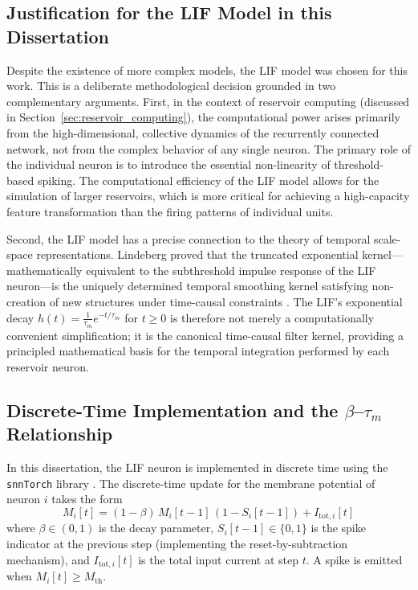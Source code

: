 \subsection{Justification for the LIF Model in this Dissertation}
\label{sec:lif_justification}
Despite the existence of more complex models, the LIF model was chosen for this work. This is a deliberate methodological decision grounded in two complementary arguments. First, in the context of reservoir computing (discussed in Section~\ref{sec:reservoir_computing}), the computational power arises primarily from the high-dimensional, collective dynamics of the recurrently connected network, not from the complex behavior of any single neuron. The primary role of the individual neuron is to introduce the essential non-linearity of threshold-based spiking. The computational efficiency of the LIF model allows for the simulation of larger reservoirs, which is more critical for achieving a high-capacity feature transformation than the firing patterns of individual units.

Second, the LIF model has a precise connection to the theory of temporal scale-space representations. Lindeberg proved that the truncated exponential kernel---mathematically equivalent to the subthreshold impulse response of the LIF neuron---is the uniquely determined temporal smoothing kernel satisfying non-creation of new structures under time-causal constraints \cite{lindeberg_2016}. The LIF's exponential decay $h(t) = \frac{1}{\tau_m} e^{-t/\tau_m}$ for $t \ge 0$ is therefore not merely a computationally convenient simplification; it is the canonical time-causal filter kernel, providing a principled mathematical basis for the temporal integration performed by each reservoir neuron.

\subsection{Discrete-Time Implementation and the $\beta$--$\tau_m$ Relationship}
\label{sec:discrete_lif}
In this dissertation, the LIF neuron is implemented in discrete time using the \texttt{snnTorch} library \cite{eshraghian_training_2023}. The discrete-time update for the membrane potential of neuron $i$ takes the form
\begin{equation}
    M_i[t] = (1 - \beta)\, M_i[t-1]\,(1 - S_i[t-1]) + I_{\text{tot},i}[t]
    \label{eq:lif_discrete}
\end{equation}
where $\beta \in (0,1)$ is the decay parameter, $S_i[t-1] \in \{0,1\}$ is the spike indicator at the previous step (implementing the reset-by-subtraction mechanism), and $I_{\text{tot},i}[t]$ is the total input current at step $t$. A spike is emitted when $M_i[t] \geq M_{\text{th}}$.


